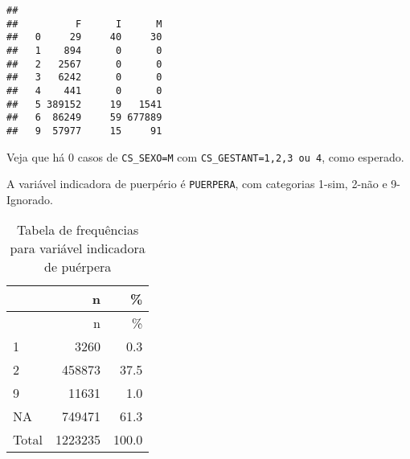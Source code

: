 \documentclass[
]{article}
\newenvironment{Shaded}{\begin{snugshade}}{\end{snugshade}}
\newcommand{\AttributeTok}[1]{\textcolor[rgb]{0.77,0.63,0.00}{#1}}
\newcommand{\CommentTok}[1]{\textcolor[rgb]{0.56,0.35,0.01}{\textit{#1}}}
\newcommand{\ConstantTok}[1]{\textcolor[rgb]{0.00,0.00,0.00}{#1}}
\newcommand{\DecValTok}[1]{\textcolor[rgb]{0.00,0.00,0.81}{#1}}
\newcommand{\FunctionTok}[1]{\textcolor[rgb]{0.00,0.00,0.00}{#1}}
\newcommand{\NormalTok}[1]{#1}
\newcommand{\SpecialCharTok}[1]{\textcolor[rgb]{0.00,0.00,0.00}{#1}}
\newcommand{\StringTok}[1]{\textcolor[rgb]{0.31,0.60,0.02}{#1}}
\begin{document}
\begin{Shaded}
\end{Shaded}

\begin{verbatim}
##    
##          F      I      M
##   0     29     40     30
##   1    894      0      0
##   2   2567      0      0
##   3   6242      0      0
##   4    441      0      0
##   5 389152     19   1541
##   6  86249     59 677889
##   9  57977     15     91
\end{verbatim}

Veja que há 0 casos de \texttt{CS\_SEXO=M} com
\texttt{CS\_GESTANT=1,2,3\ ou\ 4}, como esperado.

A variável indicadora de puerpério é \texttt{PUERPERA}, com categorias
1-sim, 2-não e 9-Ignorado.

\begin{Shaded}
\end{Shaded}

\begin{longtable}[]{@{}lrr@{}}
\caption{Tabela de frequências para variável indicadora de
puérpera}\tabularnewline
\toprule
& n & \% \\
\midrule
\endfirsthead
\toprule
& n & \% \\
\midrule
\endhead
1 & 3260 & 0.3 \\
2 & 458873 & 37.5 \\
9 & 11631 & 1.0 \\
NA & 749471 & 61.3 \\
Total & 1223235 & 100.0 \\
\bottomrule
\end{longtable}
\end{document}
